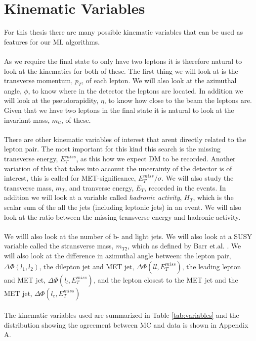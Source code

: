 \documentclass[14pt, a4paper]{book}
\begin{document}
\clearpage
\section{Kinematic Variables}
For this thesis there are many possible kinematic variables that can be used  as features for our ML algorithms.\\
\\As we require the final state to only have two leptons it is therefore natural to look at the kinematics for both of these. The first thing we will look at is the transverse momentum, $p_T$, of each lepton. 
We will also look at the azimuthal angle, $\phi$, to know where in the detector the leptons are located. In addition we will look at the pseudorapidity, $\eta$, to know how close to the beam the leptons are. 
Given that we have two leptons in the final state it is natural to look at the invariant mass, $m_{ll}$, of these. \\
\\There are other kinematic variables of interest that arent directly related to the lepton pair. The most important for this kind this search is the missing transverse energy, $E_T^{miss}$, as this how we expect DM to be recorded.
Another variation of this that takes into account the uncerainty of the detector is of interest, this is called for MET-significance, $E_T^{miss}/\sigma$. We will also study the transverse mass, $m_T$, and tranverse energy, $E_T$, recorded in the events.
In addition we will look at a variable called \textit{hadronic activity}, $H_T$, which is the scalar sum of the all the jets (including leptonic jets) in an event. We will also look at the ratio between the missing transverse energy and hadronic activity.\\
\\ We willl also look at the number of b- and light jets. We will also look at a SUSY variable called the stransverse mass, $m_{T2}$, which as defined by Barr et.al. \cite{Barr_2003}. 
We will also look at the difference in azimuthal angle between: the lepton pair, $\Delta\Phi(l_1,l_2)$, the dilepton jet and MET jet, $\Delta\Phi(ll,E_T^{miss})$, the leading lepton and MET jet, $\Delta\Phi(l_l,E_T^{miss})$, 
and the lepton closest to the MET jet and the MET jet, $\Delta\Phi(l_c,E_T^{miss})$\\
\\The kinematic variables used are summarized in Table \ref{tab:variables} and the distribution showing the agreement between MC and data is shown in Appendix A.
\end{document}
